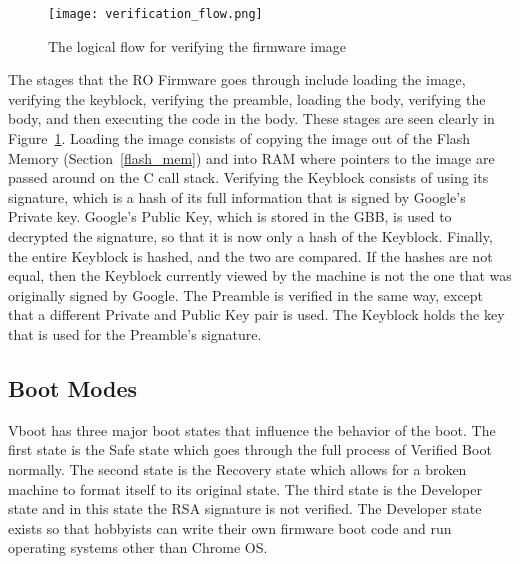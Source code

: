 \documentclass[../report.tex]{subfiles}
\begin{document}
\begin{figure}
  \centering
  \texttt{[image: verification\_flow.png]}
  \caption{The logical flow for verifying the firmware image}\label{fig:verif_flow}
\end{figure}

The stages that the RO Firmware goes through include loading the image, verifying the keyblock, verifying the preamble, loading the body, verifying the body, and then executing the code in the body. 
These stages are seen clearly in Figure~\ref{fig:verif_flow}.
Loading the image consists of copying the image out of the Flash Memory (Section~\ref{flash_mem}) and into RAM where pointers to the image are passed around on the C call stack.
Verifying the Keyblock consists of using its signature, which is a hash of its full information that is signed by Google's Private key.
Google's Public Key, which is stored in the GBB, is used to decrypted the signature, so that it is now only a hash of the Keyblock.
Finally, the entire Keyblock is hashed, and the two are compared.
If the hashes are not equal, then the Keyblock currently viewed by the machine is not the one that was originally signed by Google.
The Preamble is verified in the same way, except that a different Private and Public Key pair is used.
The Keyblock holds the key that is used for the Preamble's signature.

\subsection{Boot Modes}\label{sec:boot-modes}

Vboot has three major boot states that influence the behavior of the boot. 
The first state is the Safe state which goes through the full process of Verified Boot normally.
The second state is the Recovery state which allows for a broken machine to format itself to its original state.
The third state is the Developer state and in this state the RSA signature is not verified.
The Developer state exists so that hobbyists can write their own firmware boot code and run operating systems other than Chrome OS\@.
\end{document}
